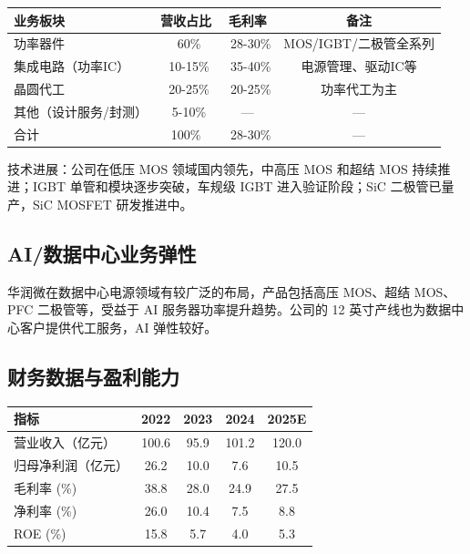 \begin{exhibitbox}[表 6-5：华润微业务结构]
\centering
\small
\begin{tabularx}{\textwidth}{X c c c}
\toprule
\textbf{业务板块} & \textbf{营收占比} & \textbf{毛利率} & \textbf{备注} \\
\midrule
功率器件 & ~60\% & ~28-30\% & MOS/IGBT/二极管全系列 \\
集成电路（功率IC） & ~10-15\% & ~35-40\% & 电源管理、驱动IC等 \\
晶圆代工 & ~20-25\% & ~20-25\% & 功率代工为主 \\
其他（设计服务/封测） & ~5-10\% & — & — \\
\midrule
合计 & 100\% & ~28-30\% & — \\
\bottomrule
\end{tabularx}
\end{exhibitbox}

技术进展：公司在低压 MOS 领域国内领先，中高压 MOS 和超结 MOS 持续推进；IGBT 单管和模块逐步突破，车规级 IGBT 进入验证阶段；SiC 二极管已量产，SiC MOSFET 研发推进中。

\subsection{AI/数据中心业务弹性}

华润微在数据中心电源领域有较广泛的布局，产品包括高压 MOS、超结 MOS、PFC 二极管等，受益于 AI 服务器功率提升趋势。公司的 12 英寸产线也为数据中心客户提供代工服务，AI 弹性较好。

\subsection{财务数据与盈利能力}

\begin{exhibitbox}[表 6-6：华润微核心财务数据]
\centering
\small
\begin{tabularx}{\textwidth}{X c c c c}
\toprule
\textbf{指标} & \textbf{2022} & \textbf{2023} & \textbf{2024} & \textbf{2025E} \\
\midrule
营业收入（亿元） & 100.6 & 95.9 & 101.2 & 120.0 \\
归母净利润（亿元） & 26.2 & 10.0 & 7.6 & 10.5 \\
毛利率 (\%) & 38.8 & 28.0 & 24.9 & 27.5 \\
净利率 (\%) & 26.0 & 10.4 & 7.5 & 8.8 \\
ROE (\%) & 15.8 & 5.7 & 4.0 & 5.3 \\
\bottomrule
\end{tabularx}
\end{exhibitbox}

